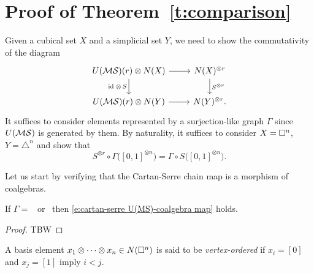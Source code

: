 
\section{Proof of Theorem~\ref{t:comparison}} \label{s:proof2}

Given a cubical set $X$ and a simplicial set $Y$, we need to show the commutativity of the diagram
\begin{equation*}
\begin{tikzcd}
U(\MS)(r) \otimes \cchains(X) \arrow[r] \arrow[d, "\id\; \otimes\, S"'] &
\cchains(X)^{\otimes r} \arrow[d, "S^{\otimes r}"] \\
U(\MS)(r) \otimes \cchains(Y) \arrow[r] &
\cchains(Y)^{\otimes r}.
\end{tikzcd}
\end{equation*}
It suffices to consider elements represented by a surjection-like graph $\Gamma$ since $U(\mathcal{MS})$ is generated by them.
By naturality, it suffices to consider $X = \square^n$, $Y = \triangle^n$ and show that
\begin{equation} \label{e:cartan-serre U(MS)-coalgebra map}
S^{\otimes r} \circ \Gamma\big( [0,1]^{\otimes n} \big) = \Gamma \circ S \big( [0,1]^{\otimes n} \big).
\end{equation}

Let us start by verifying that the Cartan-Serre chain map is a morphism of coalgebras.
\begin{lemma}
	If $\Gamma =$ \counit \ or \coproduct \ then \eqref{e:cartan-serre U(MS)-coalgebra map} holds.
\end{lemma}

\begin{proof}
	TBW
\end{proof}

\begin{definition}
	A basis element $x_1 \otimes \cdots \otimes x_n \in N(\square^n)$ is said to be  \textit{vertex-ordered} if $x_i = [0]$ and $x_j = [1]$ imply $i < j$.
\end{definition}

